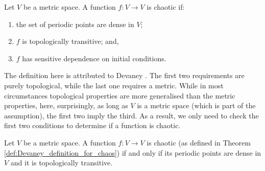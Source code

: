 \begin{defn}\label{def:Devaney_definition_for_chaos}
	Let $V$ be a metric space.
	A function $f: V \rightarrow V$ is chaotic if:
	\begin{enumerate}
		\item the set of periodic points are dense in $V$;
		\item $f$ is topologically transitive; and,
		\item $f$ has sensitive dependence on initial conditions. 
	\end{enumerate}
	
\end{defn}


The definition here is attributed to Devaney \cite{Devaney_green_book_chaos_definition}. 
The first two requirements are purely topological, while the last one requires a metric. 
While in most circumstances topological properties are more generalised than the metric properties, here, surprisingly, as long as $V$ is a metric space (which is part of the assumption), the first two imply the third\cite{Banks}. 
As a result, we only need to check the first two conditions to determine if a function is chaotic.

\begin{thm}
	Let $V$ be a metric space. 
	A function $f: V \rightarrow V$ is chaotic (as defined in Theorem \ref{def:Devaney_definition_for_chaos})
	if and only if its periodic points are dense in $V$ and it is topologically transitive.
\end{thm}


